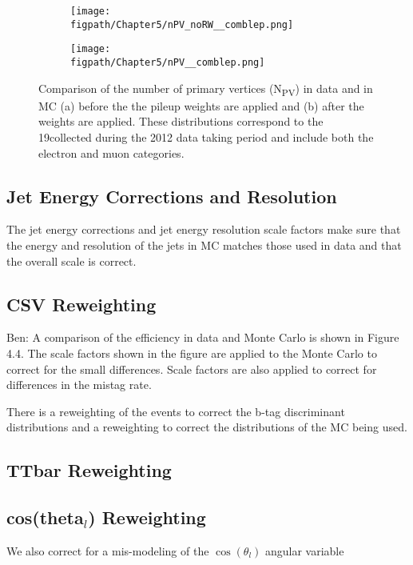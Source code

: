 \begin{figure}[!hbt]
    \centering
    \begin{subfigure}[t]{0.48\textwidth}
      \texttt{[image: \\figpath/Chapter5/nPV\_noRW\_\_comblep.png]}
      \caption{}
      \label{fig:npv_no_pileup_reweight}
    \end{subfigure}
    \begin{subfigure}[t]{0.48\textwidth}
      \texttt{[image: \\figpath/Chapter5/nPV\_\_comblep.png]}
      \caption{}
      \label{fig:npv_pileup_reweight}
    \end{subfigure}
    \caption{Comparison of the number of primary vertices (N\textsubscript{PV}) in data and in MC (a) before the the pileup weights are applied and (b) after the weights are applied. These distributions correspond to the 19\fbinv collected during the 2012 data taking period and include both the electron and muon categories.}
    \label{fig:npv_comparison}
\end{figure}

\subsection{Jet Energy Corrections and Resolution}

The jet energy corrections and jet energy resolution scale factors make sure that the energy and resolution of the jets in MC matches those used in data and that the overall scale is correct.

\subsection{CSV Reweighting}
Ben: A comparison of the efficiency in data and Monte Carlo is shown in Figure 4.4. The scale factors shown in the figure are applied to the Monte Carlo to correct for the small differences. Scale factors are also applied to correct for differences in the mistag rate.

There is a reweighting of the events to correct the b-tag discriminant distributions and a reweighting to correct the \pt distributions of the \ttbar MC being used.

\subsection{TTbar Reweighting}
\subsection{\texorpdfstring{cos(theta$_l$)}{CosThetaL} Reweighting}
We also correct for a mis-modeling of the $\cos\left(\theta_{l}\right)$ angular variable

